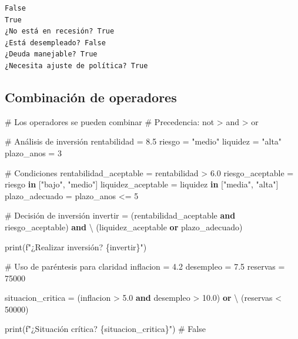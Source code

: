 \documentclass[
  doc,
  floatsintext,
  longtable,
  a4paper,
  nolmodern,
  notxfonts,
  notimes,
  12pt,
  colorlinks=true,linkcolor=blue,citecolor=blue,urlcolor=blue]{apa7}
\newenvironment{Shaded}{\begin{snugshade}}{\end{snugshade}}
\newcommand{\BuiltInTok}[1]{\textcolor[rgb]{0.00,0.23,0.31}{#1}}
\newcommand{\CommentTok}[1]{\textcolor[rgb]{0.37,0.37,0.37}{#1}}
\newcommand{\DecValTok}[1]{\textcolor[rgb]{0.68,0.00,0.00}{#1}}
\newcommand{\FloatTok}[1]{\textcolor[rgb]{0.68,0.00,0.00}{#1}}
\newcommand{\KeywordTok}[1]{\textcolor[rgb]{0.00,0.23,0.31}{\textbf{#1}}}
\newcommand{\NormalTok}[1]{\textcolor[rgb]{0.00,0.23,0.31}{#1}}
\newcommand{\OperatorTok}[1]{\textcolor[rgb]{0.37,0.37,0.37}{#1}}
\newcommand{\SpecialCharTok}[1]{\textcolor[rgb]{0.37,0.37,0.37}{#1}}
\newcommand{\SpecialStringTok}[1]{\textcolor[rgb]{0.13,0.47,0.30}{#1}}
\newcommand{\StringTok}[1]{\textcolor[rgb]{0.13,0.47,0.30}{#1}}
\begin{document}
\begin{verbatim}
False
True
¿No está en recesión? True
¿Está desempleado? False
¿Deuda manejable? True
¿Necesita ajuste de política? True
\end{verbatim}

\subsection{Combinación de
operadores}\label{combinaciuxf3n-de-operadores}

\begin{Shaded}
\begin{Highlighting}[]
\CommentTok{\# Los operadores se pueden combinar}
\CommentTok{\# Precedencia: not \textgreater{} and \textgreater{} or}

\CommentTok{\# Análisis de inversión}
\NormalTok{rentabilidad }\OperatorTok{=} \FloatTok{8.5}
\NormalTok{riesgo }\OperatorTok{=} \StringTok{"medio"}
\NormalTok{liquidez }\OperatorTok{=} \StringTok{"alta"}
\NormalTok{plazo\_anos }\OperatorTok{=} \DecValTok{3}

\CommentTok{\# Condiciones}
\NormalTok{rentabilidad\_aceptable }\OperatorTok{=}\NormalTok{ rentabilidad }\OperatorTok{\textgreater{}} \FloatTok{6.0}
\NormalTok{riesgo\_aceptable }\OperatorTok{=}\NormalTok{ riesgo }\KeywordTok{in}\NormalTok{ [}\StringTok{"bajo"}\NormalTok{, }\StringTok{"medio"}\NormalTok{]}
\NormalTok{liquidez\_aceptable }\OperatorTok{=}\NormalTok{ liquidez }\KeywordTok{in}\NormalTok{ [}\StringTok{"media"}\NormalTok{, }\StringTok{"alta"}\NormalTok{]}
\NormalTok{plazo\_adecuado }\OperatorTok{=}\NormalTok{ plazo\_anos }\OperatorTok{\textless{}=} \DecValTok{5}

\CommentTok{\# Decisión de inversión}
\NormalTok{invertir }\OperatorTok{=}\NormalTok{ (rentabilidad\_aceptable }\KeywordTok{and}\NormalTok{ riesgo\_aceptable) }\KeywordTok{and} \OperatorTok{\textbackslash{}}
\NormalTok{           (liquidez\_aceptable }\KeywordTok{or}\NormalTok{ plazo\_adecuado)}

\BuiltInTok{print}\NormalTok{(}\SpecialStringTok{f"¿Realizar inversión? }\SpecialCharTok{\{}\NormalTok{invertir}\SpecialCharTok{\}}\SpecialStringTok{"}\NormalTok{)}

\CommentTok{\# Uso de paréntesis para claridad}
\NormalTok{inflacion }\OperatorTok{=} \FloatTok{4.2}
\NormalTok{desempleo }\OperatorTok{=} \FloatTok{7.5}
\NormalTok{reservas }\OperatorTok{=} \DecValTok{75000}

\NormalTok{situacion\_critica }\OperatorTok{=}\NormalTok{ (inflacion }\OperatorTok{\textgreater{}} \FloatTok{5.0} \KeywordTok{and}\NormalTok{ desempleo }\OperatorTok{\textgreater{}} \FloatTok{10.0}\NormalTok{) }\KeywordTok{or} \OperatorTok{\textbackslash{}}
\NormalTok{                    (reservas }\OperatorTok{\textless{}} \DecValTok{50000}\NormalTok{)}

\BuiltInTok{print}\NormalTok{(}\SpecialStringTok{f"¿Situación crítica? }\SpecialCharTok{\{}\NormalTok{situacion\_critica}\SpecialCharTok{\}}\SpecialStringTok{"}\NormalTok{)  }\CommentTok{\# False}
\end{Highlighting}
\end{Shaded}
\end{document}
